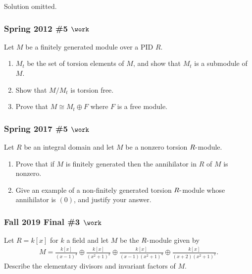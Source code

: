 Solution omitted.

\hypertarget{spring-2012-5-work}{%
\subsubsection{\texorpdfstring{Spring 2012 \#5
\(\work\)}{Spring 2012 \#5 \textbackslash work}}\label{spring-2012-5-work}}

Let \(M\) be a finitely generated module over a PID \(R\).

\begin{enumerate}
\def\labelenumi{\alph{enumi}.}
\item
  \(M_t\) be the set of torsion elements of \(M\), and show that \(M_t\)
  is a submodule of \(M\).
\item
  Show that \(M/M_t\) is torsion free.
\item
  Prove that \(M \cong M_t \oplus F\) where \(F\) is a free module.
\end{enumerate}

\hypertarget{spring-2017-5-work}{%
\subsubsection{\texorpdfstring{Spring 2017 \#5
\(\work\)}{Spring 2017 \#5 \textbackslash work}}\label{spring-2017-5-work}}

Let \(R\) be an integral domain and let \(M\) be a nonzero torsion
\(R{\hbox{-}}\)module.

\begin{enumerate}
\def\labelenumi{\alph{enumi}.}
\item
  Prove that if \(M\) is finitely generated then the annihilator in
  \(R\) of \(M\) is nonzero.
\item
  Give an example of a non-finitely generated torsion
  \(R{\hbox{-}}\)module whose annihilator is \((0)\), and justify your
  answer.
\end{enumerate}

\hypertarget{fall-2019-final-3-work}{%
\subsubsection{\texorpdfstring{Fall 2019 Final \#3
\(\work\)}{Fall 2019 Final \#3 \textbackslash work}}\label{fall-2019-final-3-work}}

Let \(R = k[x]\) for \(k\) a field and let \(M\) be the
\(R{\hbox{-}}\)module given by
\begin{align*}
M=\frac{k[x]}{(x-1)^{3}} \oplus \frac{k[x]}{\left(x^{2}+1\right)^{2}} \oplus \frac{k[x]}{(x-1)\left(x^{2}+1\right)^{4}} \oplus \frac{k[x]}{(x+2)\left(x^{2}+1\right)^{2}}
.\end{align*}
Describe the elementary divisors and invariant factors of \(M\).

